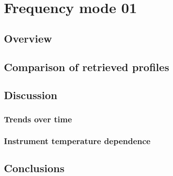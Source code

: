\section{Frequency mode 01}
\label{sec:fm01}

\subsection{Overview}
\label{sec:fm01:overview}

\subsection{Comparison of retrieved profiles}
\label{sec:fm01:comparison}

\subsubsection{}
\label{sec:fm01:comparison:O3}

\subsubsection{}
\label{sec:fm01:comparison:ClO}

\subsubsection{}
\label{sec:fm01:comparison:N2O}

\subsubsection{}
\label{sec:fm01:comparison:temperature}

\subsection{Discussion}
\label{sec:fm01:discussion}

\subsubsection{Trends over time}
\label{sec:fm01:discussion:time}

\subsubsection{Instrument temperature dependence}
\label{sec:fm01:discussion:temperature}

\subsection{Conclusions}
\label{sec:fm01:conclusions}
